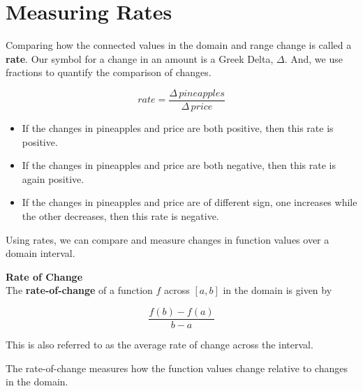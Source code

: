 \documentclass{ximera}
\begin{document}
\section{Measuring Rates}
Comparing how the connected values in the domain and range change is called a \textbf{rate}. Our symbol for a change in an amount is a Greek Delta, $\Delta$.  And, we use fractions to quantify the comparison of changes.

\[ rate = \frac{\Delta \, pineapples}{\Delta \, price}\]




\begin{itemize}
\item If the changes in pineapples and price are both positive, then this rate is positive.
\item If the changes in pineapples and price are both negative, then this rate is again positive.
\item If the changes in pineapples and price are of different sign, one increases while the other decreases, then this rate is negative.
\end{itemize}


Using rates, we can compare and measure changes in function values over a domain interval.


\begin{definition}  \textbf{\textcolor{green!50!black}{Rate of Change}} \\
The \textbf{rate-of-change} of a function $f$ across $[a, b]$ in the domain is given by

\[  \frac{f(b) - f(a)}{b - a}  \]



This is also referred to as the average rate of change across the interval.

\end{definition}

The rate-of-change measures how the function values change relative to changes in the domain.
\end{document}
